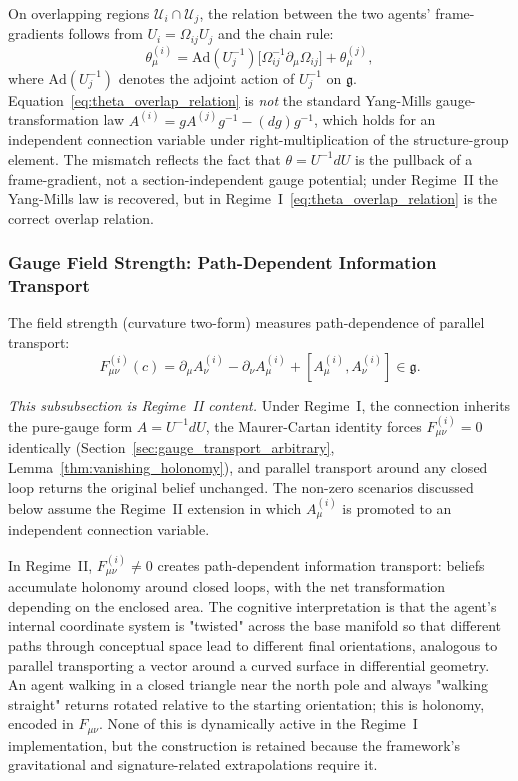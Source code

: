 \documentclass[11pt]{article}
\begin{document}
On overlapping regions $\mathcal{U}_i \cap \mathcal{U}_j$, the relation between the two agents' frame-gradients follows from $U_i = \Omega_{ij} U_j$ and the chain rule:
\begin{equation}
\theta^{(i)}_\mu = \mathrm{Ad}(U_j^{-1})\big[\Omega_{ij}^{-1} \partial_\mu \Omega_{ij}\big] + \theta^{(j)}_\mu,
\label{eq:theta_overlap_relation}
\end{equation}
where $\mathrm{Ad}(U_j^{-1})$ denotes the adjoint action of $U_j^{-1}$ on $\mathfrak{g}$. Equation~\eqref{eq:theta_overlap_relation} is \emph{not} the standard Yang-Mills gauge-transformation law $A^{(i)} = g A^{(j)} g^{-1} - (dg) g^{-1}$, which holds for an independent connection variable under right-multiplication of the structure-group element. The mismatch reflects the fact that $\theta = U^{-1}dU$ is the pullback of a frame-gradient, not a section-independent gauge potential; under Regime~II the Yang-Mills law is recovered, but in Regime~I~\eqref{eq:theta_overlap_relation} is the correct overlap relation.

\subsubsection{Gauge Field Strength: Path-Dependent Information Transport}
\label{sec:field_strength}

The field strength (curvature two-form) measures path-dependence of parallel transport:
\begin{equation}
F^{(i)}_{\mu\nu}(c) = \partial_\mu A^{(i)}_\nu - \partial_\nu A^{(i)}_\mu + [A^{(i)}_\mu, A^{(i)}_\nu] \in \mathfrak{g}.
\end{equation}

\emph{This subsubsection is Regime~II content.} Under Regime~I, the connection inherits the pure-gauge form $A = U^{-1}dU$, the Maurer-Cartan identity forces $F^{(i)}_{\mu\nu} = 0$ identically (Section~\ref{sec:gauge_transport_arbitrary}, Lemma~\ref{thm:vanishing_holonomy}), and parallel transport around any closed loop returns the original belief unchanged. The non-zero scenarios discussed below assume the Regime~II extension in which $A^{(i)}_\mu$ is promoted to an independent connection variable.

In Regime~II, $F^{(i)}_{\mu\nu} \neq 0$ creates path-dependent information transport: beliefs accumulate holonomy around closed loops, with the net transformation depending on the enclosed area. The cognitive interpretation is that the agent's internal coordinate system is "twisted" across the base manifold so that different paths through conceptual space lead to different final orientations, analogous to parallel transporting a vector around a curved surface in differential geometry. An agent walking in a closed triangle near the north pole and always "walking straight" returns rotated relative to the starting orientation; this is holonomy, encoded in $F_{\mu\nu}$. None of this is dynamically active in the Regime~I implementation, but the construction is retained because the framework's gravitational and signature-related extrapolations require it.
\end{document}
